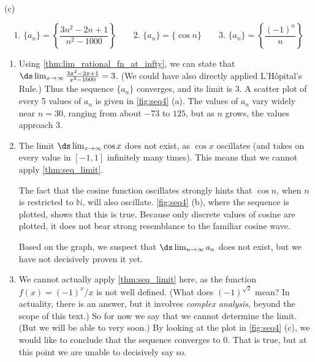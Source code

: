 \begin{example}
{
\\(c)}
%
\[
 \text{1. }\{a_n\} = \left\{\frac{3n^2-2n+1}{n^2-1000}\right\}\qquad
 \text{2. }\{a_n\} = \{\cos n \}\qquad
 \text{3. }\{a_n\} = \left\{\frac{(-1)^n}{n}\right\}
\]
\solution
\begin{enumerate}
\item		Using \autoref{thm:lim_rational_fn_at_infty}, we can state that $\ds\lim_{x\to\infty} \frac{3x^2-2x+1}{x^2-1000} = 3$. (We could have also directly applied L'Hôpital's Rule.) Thus the sequence $\{a_n\}$ converges, and its limit is 3. A scatter plot of every 5 values of $a_n$ is given in \autoref{fig:seq4} (a). The values of $a_n$ vary widely near $n=30$, ranging from about $-73$ to $125$, but as $n$ grows, the values approach 3.

\item		The limit $\ds\lim_{x\to\infty}\cos x$ does not exist, as $\cos x$ oscillates (and takes on every value in $[-1,1]$ infinitely many times). This means that we cannot apply \autoref{thm:seq_limit}. 

The fact that the cosine function oscillates strongly hints that $\cos n$, when $n$ is restricted to $\mathbb{N}$, will also oscillate. \autoref{fig:seq4} (b), where the sequence is plotted, shows that this is true. Because only discrete values of cosine are plotted, it does not bear strong resemblance to the familiar cosine wave.

Based on the graph, we suspect that $\ds \lim_{n\to\infty} a_n$ does not exist, but we have not decisively proven it yet.


\item		We cannot actually apply \autoref{thm:seq_limit} here, as the function $f(x) = (-1)^x/x$ is not well defined. (What does $(-1)^{\sqrt{2}}$ mean? In actuality, there is an answer, but it involves \emph{complex analysis}, beyond the scope of this text.) So for now we say that we cannot determine the limit. (But we will be able to very soon.) By looking at the plot in \autoref{fig:seq4} (c), we would like to conclude that the sequence converges to 0. That is true, but at this point we are unable to decisively say so.
\end{enumerate}
\end{example}

